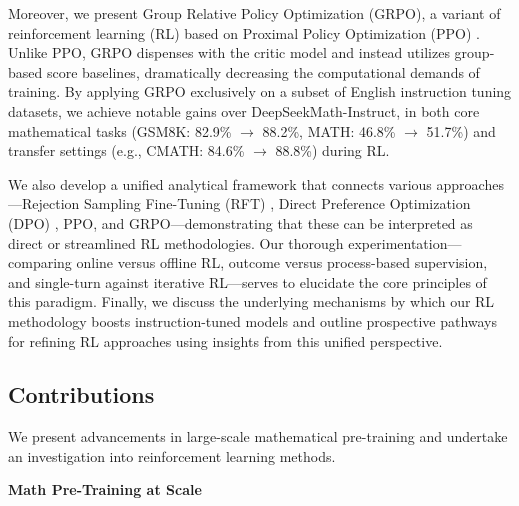 Moreover, we present Group Relative Policy Optimization (GRPO), a variant of reinforcement learning (RL) based on Proximal Policy Optimization (PPO) \citep{schulman2017proximal}. Unlike PPO, GRPO dispenses with the critic model and instead utilizes group-based score baselines, dramatically decreasing the computational demands of training. By applying GRPO exclusively on a subset of English instruction tuning datasets, we achieve notable gains over DeepSeekMath-Instruct, in both core mathematical tasks (GSM8K: 82.9\% $\rightarrow$ 88.2\%, MATH: 46.8\% $\rightarrow$ 51.7\%) and transfer settings (e.g., CMATH: 84.6\% $\rightarrow$ 88.8\%) during RL.

We also develop a unified analytical framework that connects various approaches—Rejection Sampling Fine-Tuning (RFT) \citep{yuan2023scaling}, Direct Preference Optimization (DPO) \citep{dpo}, PPO, and GRPO—demonstrating that these can be interpreted as direct or streamlined RL methodologies. Our thorough experimentation—comparing online versus offline RL, outcome versus process-based supervision, and single-turn against iterative RL—serves to elucidate the core principles of this paradigm. Finally, we discuss the underlying mechanisms by which our RL methodology boosts instruction-tuned models and outline prospective pathways for refining RL approaches using insights from this unified perspective.

\subsection{Contributions}
We present advancements in large-scale mathematical pre-training and undertake an investigation into reinforcement learning methods.

\textbf{Math Pre-Training at Scale}

